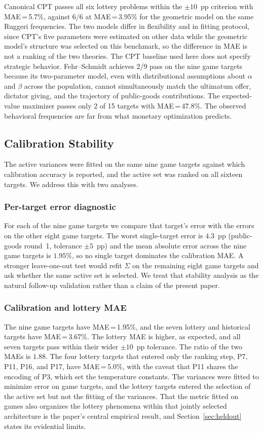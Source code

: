\documentclass[journal]{IEEEtran}
\begin{document}
Canonical CPT passes all six lottery problems within the $\pm10$~pp criterion with MAE\,=\,5.7\%, against 6/6 at MAE\,=\,3.95\% for the geometric model on the same Ruggeri frequencies.
The two models differ in flexibility and in fitting protocol, since CPT's five parameters were estimated on other data while the geometric model's structure was selected on this benchmark, so the difference in MAE is not a ranking of the two theories.
The CPT baseline used here does not specify strategic behavior.
Fehr--Schmidt achieves 2/9 pass on the nine game targets because its two-parameter model, even with distributional assumptions about $\alpha$ and $\beta$ across the population, cannot simultaneously match the ultimatum offer, dictator giving, and the trajectory of public-goods contributions.
The expected-value maximizer passes only 2 of 15 targets with MAE\,=\,47.8\%.
The observed behavioral frequencies are far from what monetary optimization predicts.

\subsection{Calibration Stability}

The active variances were fitted on the same nine game targets against which calibration accuracy is reported, and the active set was ranked on all sixteen targets.
We address this with two analyses.

\subsubsection{Per-target error diagnostic}
For each of the nine game targets we compare that target's error with the errors on the other eight game targets.
The worst single-target error is $4.3$~pp (public-goods round~1, tolerance $\pm5$~pp) and the mean absolute error across the nine game targets is $1.95$\%, so no single target dominates the calibration MAE.
A stronger leave-one-out test would refit $\Sigma$ on the remaining eight game targets and ask whether the same active set is selected.
We treat that stability analysis as the natural follow-up validation rather than a claim of the present paper.

\subsubsection{Calibration and lottery MAE}
The nine game targets have MAE\,=\,1.95\%, and the seven lottery and historical targets have MAE\,=\,3.67\%.
The lottery MAE is higher, as expected, and all seven targets pass within their wider $\pm10$~pp tolerance.
The ratio of the two MAEs is $1.88$.
The four lottery targets that entered only the ranking step, P7, P11, P16, and P17, have MAE\,=\,5.0\%, with the caveat that P11 shares the encoding of P3, which set the temperature constants.
The variances were fitted to minimize error on game targets, and the lottery targets entered the selection of the active set but not the fitting of the variances.
That the metric fitted on games also organizes the lottery phenomena within that jointly selected architecture is the paper's central empirical result, and Section~\ref{sec:heldout} states its evidential limits.
\end{document}

